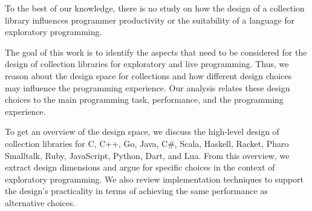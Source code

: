 \documentclass[sigconf, authorversion]{acmart}
\begin{document}
To the best of our knowledge,
there is no study on how the design of a collection library
influences programmer productivity
or the suitability of a language for exploratory programming.

The goal of this work is to identify the aspects
that need to be considered for the design of collection libraries
for exploratory and live programming.
%
%
Thus, we reason about the design space for collections
and how different design choices may influence the programming experience.
Our analysis relates these design choices to the main programming task,
performance, and the programming experience.

To get an overview of the design space,
we discuss the high-level design of collection libraries for
C, C++, Go, Java, C\#, Scala, Haskell, Racket, Pharo Smalltalk, Ruby, JavaScript, Python, Dart, and Lua.
From this overview, we extract design dimensions and 
argue for specific choices in the context of exploratory programming.
We also review implementation techniques
to support the design's practicality
in terms of achieving the same performance as alternative choices.
\end{document}
